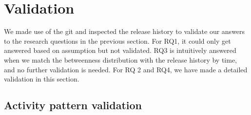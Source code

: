 \documentclass[conference]{IEEEtran}
\begin{document}




\section{Validation}
\label{validation}
We made use of the git and inspected the
release history to validate our answers to the research questions in the previous section.
For RQ1, it could only get answered based on assumption but not validated. RQ3 is intuitively answered when we match the betweenness distribution with the release history by time, and no further validation is needed. For RQ 2 and RQ4, we have made a detailed validation in this section.

\subsection{Activity pattern validation}
\end{document}
